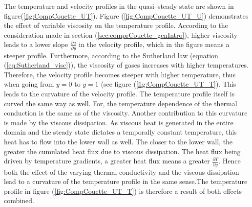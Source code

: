 \documentclass[11pt,a4paper,twoside]{report}
\begin{document}
The temperature and velocity profiles in the quasi--steady state are shown in figure(\ref{fig:CompCouette_UT}). Figure (\ref{fig:CompCouette_UT_U}) demonstrates the effect of variable viscosity on the temperature profile. According to the consideration made in section (\ref{sec:comprCouette_genIntro}), higher viscosity leads to a lower slope $\frac{\partial u}{\partial y}$ in the velocity profile, which in the figure means a steeper profile. Furthermore, according to the Sutherland law (equation (\ref{eq:Sutherland_visc})), the viscosity of gases increases with higher temperatures.
Therefore, the velocity profile becomes steeper with higher temperature, thus when going from $y=0$ to $y=1$ (see figure (\ref{fig:CompCouette_UT_T}). This leads to the curvature of the velocity profile.
The temperature profile itself is curved the same way as well. For, the temperature dependence of the thermal conduction is the same as of the viscosity. Another contribution to this curvature is made by the viscous dissipation. As viscous heat is generated in the entire domain and the steady state dictates a temporally constant temperature, this heat has to flow into the lower wall as well. The closer to the lower wall, the greater the cumulated heat flux due to viscous dissipation. The heat flux being driven by temperature gradients, a greater heat flux means a greater  $\frac{\partial T}{\partial y}$. 
Hence both the effect of the varying thermal conductivity and the viscous dissipation lead to a curvature of the temperature profile in the same sense.The temperature profile in figure (\ref{fig:CompCouette_UT_T}) is therefore a result of both effects combined.
\end{document}

